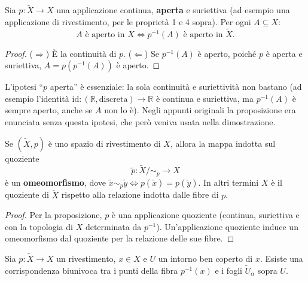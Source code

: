 \begin{prop}
Sia $p: \widetilde{X} \to X$ una applicazione continua, \textbf{aperta} e suriettiva (ad esempio una applicazione di rivestimento, per le propriet\`a 1 e 4 sopra). Per ogni $A \subseteq X$:
\[
A \text{ è aperto in } X \iff p^{-1}(A) \text{ è aperto in } \widetilde{X}.
\]
\end{prop}

\begin{proof}
($\Rightarrow$) \`E la continuit\`a di $p$. ($\Leftarrow$) Se $p^{-1}(A)$ \`e aperto, poich\'e $p$ \`e aperta e suriettiva, $A = p(p^{-1}(A))$ \`e aperto. \qedhere
\end{proof}

\begin{observacion}
L'ipotesi ``$p$ aperta'' \`e essenziale: la sola continuit\`a e suriettivit\`a non bastano (ad esempio l'identit\`a $\mathrm{id}: (\mathbb{R}, \text{discreta}) \to \mathbb{R}$ \`e continua e suriettiva, ma $p^{-1}(A)$ \`e sempre aperto, anche se $A$ non lo \`e). Negli appunti originali la proposizione era enunciata senza questa ipotesi, che per\`o veniva usata nella dimostrazione.
\end{observacion}

\begin{coro}
Se $(\widetilde{X}, p)$ è uno spazio di rivestimento di $X$, allora la mappa indotta sul quoziente
\[
\widetilde{p}: \widetilde{X} / \sim_p \longrightarrow X
\]
è un \textbf{omeomorfismo}, dove $\widetilde{x} \sim_p \widetilde{y} \iff p(\widetilde{x}) = p(\widetilde{y})$. In altri termini $X$ \`e il quoziente di $\widetilde{X}$ rispetto alla relazione indotta dalle fibre di $p$.
\end{coro}
\begin{proof}
Per la proposizione, $p$ \`e una applicazione quoziente (continua, suriettiva e con la topologia di $X$ determinata da $p^{-1}$). Un'applicazione quoziente induce un omeomorfismo dal quoziente per la relazione delle sue fibre.
\end{proof}

\begin{prop}
Sia $p: \widetilde{X} \to X$ un rivestimento, $x \in X$ e $U$ un intorno ben coperto di $x$. Esiste una corrispondenza biunivoca tra i punti della fibra $p^{-1}(x)$ e i fogli $\widetilde{U}_\alpha$ sopra $U$.
\end{prop}

